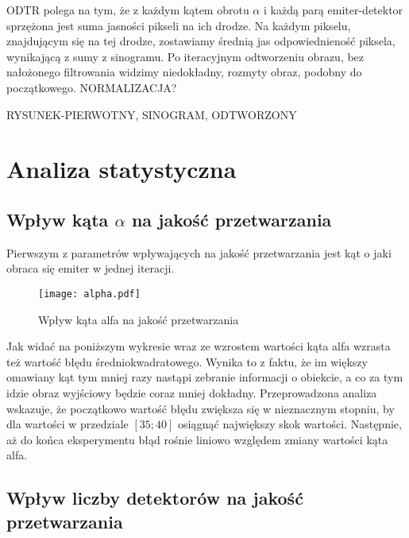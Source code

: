 \documentclass{article}
\begin{document}
ODTR polega na tym, że z każdym kątem obrotu $\alpha$ i każdą parą emiter-detektor sprzężona jest suma jasności pikseli na ich drodze. Na każdym pikselu, znajdującym się na tej drodze, zostawiamy średnią jas odpowiednieność piksela, wynikającą z sumy z sinogramu. Po iteracyjnym odtworzeniu obrazu, bez nałożonego filtrowania widzimy niedokładny, rozmyty obraz, podobny do początkowego. NORMALIZACJA? 

RYSUNEK-PIERWOTNY, SINOGRAM, ODTWORZONY

\clearpage %


\section{Analiza statystyczna}
\label{sec_analiza_statystyczna}

\subsection{Wpływ kąta $\alpha$ na jakość przetwarzania}
\label{subsec_alpha_comparison}

Pierwszym z parametrów wpływających na jakość przetwarzania jest kąt o jaki obraca się emiter w jednej iteracji. 

\begin{figure}[!htbp]
\begin{center}
\texttt{[image: alpha.pdf]}
\end{center}
\caption{Wpływ kąta alfa na jakość przetwarzania}
\label{fig:detectors_amount}
\end{figure}

Jak widać na poniższym wykresie wraz ze wzrostem wartości kąta alfa wzrasta też wartość błędu średniokwadratowego. Wynika to z faktu, że im większy omawiany kąt tym mniej razy nastąpi zebranie informacji o obiekcie, a co za tym idzie obraz wyjściowy będzie coraz mniej dokładny. 
Przeprowadzona analiza wskazuje, że początkowo wartość błędu zwiększa się w nieznacznym stopniu, by dla wartości w przedziale $\left[ 35; 40 \right]$ osiągnąć największy skok wartości. Następnie, aż do końca eksperymentu błąd rośnie liniowo względem zmiany wartości kąta alfa.

\subsection{Wpływ liczby detektorów na jakość przetwarzania}
\label{subsec_detectors_amount_comparison}
\end{document}
